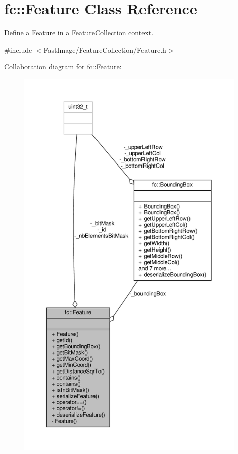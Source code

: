 \hypertarget{classfc_1_1Feature}{}\section{fc\+:\+:Feature Class Reference}
\label{classfc_1_1Feature}


Define a \hyperlink{classfc_1_1Feature}{Feature} in a \hyperlink{classfc_1_1FeatureCollection}{Feature\+Collection} context.  




{\ttfamily \#include $<$Fast\+Image/\+Feature\+Collection/\+Feature.\+h$>$}



Collaboration diagram for fc\+:\+:Feature\+:
\nopagebreak
\begin{figure}[H]
\begin{center}
\leavevmode
\includegraphics[height=550pt]{d2/da8/classfc_1_1Feature__coll__graph}
\end{center}
\end{figure}
